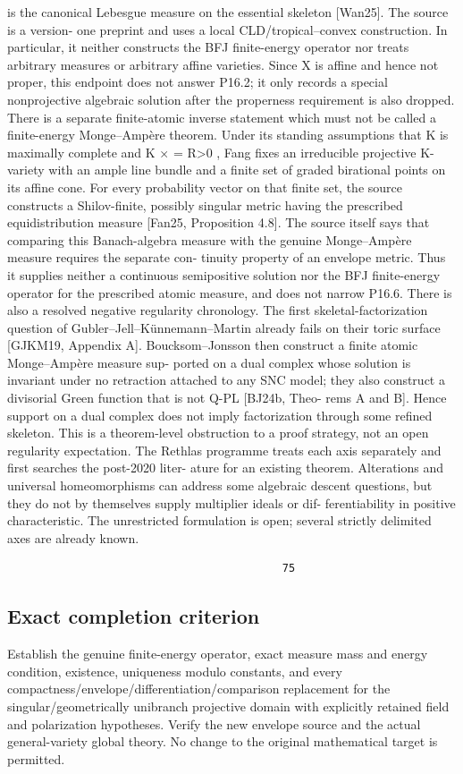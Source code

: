 \documentclass[
  10pt,
]{article}
\begin{document}
is the canonical Lebesgue measure on the essential skeleton {[}Wan25{]}.
The source is a version- one preprint and uses a local
CLD/tropical--convex construction. In particular, it neither constructs
the BFJ ﬁnite-energy operator nor treats arbitrary measures or arbitrary
aﬃne varieties. Since X is aﬃne and hence not proper, this endpoint does
not answer P16.2; it only records a special nonprojective algebraic
solution after the properness requirement is also dropped. There is a
separate ﬁnite-atomic inverse statement which must not be called a
ﬁnite-energy Monge--Ampère theorem. Under its standing assumptions that
K is maximally complete and \textbar K × \textbar{} = R\textgreater0 ,
Fang ﬁxes an irreducible projective K-variety with an ample line bundle
and a ﬁnite set of graded birational points on its aﬃne cone. For every
probability vector on that ﬁnite set, the source constructs a
Shilov-ﬁnite, possibly singular metric having the prescribed
equidistribution measure {[}Fan25, Proposition 4.8{]}. The source itself
says that comparing this Banach-algebra measure with the genuine
Monge--Ampère measure requires the separate con- tinuity property of an
envelope metric. Thus it supplies neither a continuous semipositive
solution nor the BFJ ﬁnite-energy operator for the prescribed atomic
measure, and does not narrow P16.6. There is also a resolved negative
regularity chronology. The ﬁrst skeletal-factorization question of
Gubler--Jell--Künnemann--Martin already fails on their toric surface
{[}GJKM19, Appendix A{]}. Boucksom--Jonsson then construct a ﬁnite
atomic Monge--Ampère measure sup- ported on a dual complex whose
solution is invariant under no retraction attached to any SNC model;
they also construct a divisorial Green function that is not Q-PL
{[}BJ24b, Theo- rems A and B{]}. Hence support on a dual complex does
not imply factorization through some reﬁned skeleton. This is a
theorem-level obstruction to a proof strategy, not an open regularity
expectation. The Rethlas programme treats each axis separately and ﬁrst
searches the post-2020 liter- ature for an existing theorem. Alterations
and universal homeomorphisms can address some algebraic descent
questions, but they do not by themselves supply multiplier ideals or
dif- ferentiability in positive characteristic. The unrestricted
formulation is open; several strictly delimited axes are already known.

\begin{verbatim}
                                           75
\end{verbatim}

\subsection{Exact completion
criterion}\label{exact-completion-criterion}

Establish the genuine finite-energy operator, exact measure mass and
energy condition, existence, uniqueness modulo constants, and every
compactness/envelope/differentiation/comparison replacement for the
singular/geometrically unibranch projective domain with explicitly
retained field and polarization hypotheses. Verify the new envelope
source and the actual general-variety global theory. No change to the
original mathematical target is permitted.
\end{document}
